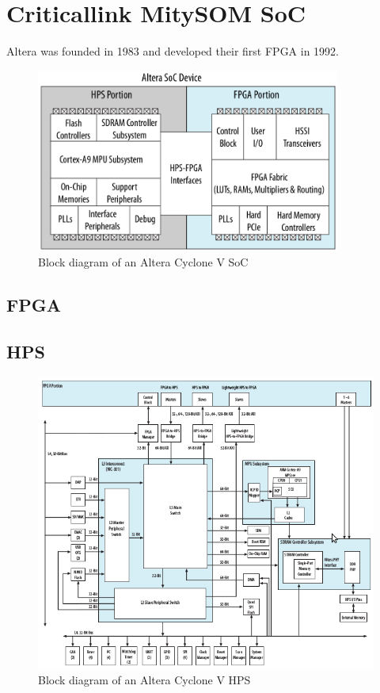 \chapter{Criticallink MitySOM SoC}
Altera was founded in 1983 and developed their first FPGA in 1992.\cite{althist16}
\begin{figure}[htbp]
\begin{center}
\includegraphics[width=10cm,keepaspectratio=true]{bilder/png/AlteraSoC}
\caption{Block diagram of an Altera Cyclone V SoC\cite[chapter 1]{AlteraHPS15}}
\label{fig:alterasocblocks}
\end{center}
\end{figure}
\section{FPGA}
\section{HPS}
\begin{figure}[htbp]
\begin{center}
\includegraphics[width=15cm,keepaspectratio=true]{bilder/png/AlteraHPS}
\caption{Block diagram of an Altera Cyclone V HPS\cite[chapter 1]{AlteraHPS15}}
\label{fig:alterahpsblocks}
\end{center}
\end{figure}
